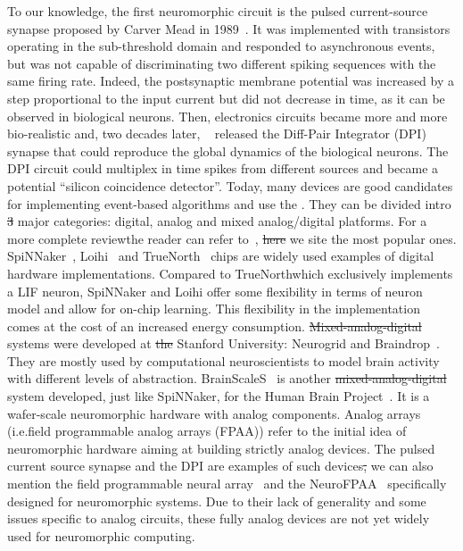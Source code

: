 \documentclass[brainsci, %
               review,accept,pdftex,moreauthors %
               ]{Definitions/mdpi}
\providecommand{\DIFadd}[1]{{\protect\color{blue}\uwave{#1}}} %
\providecommand{\DIFdel}[1]{{\protect\color{red}\sout{#1}}}                      %
\providecommand{\DIFaddbegin}{} %
\providecommand{\DIFaddend}{} %
\providecommand{\DIFdelbegin}{} %
\providecommand{\DIFdelend}{} %
\newcommand{\DIFscaledelfig}{0.5}
\newlength{\DIFdelgraphicswidth} %
\newlength{\DIFdelgraphicsheight} %
\newcommand{\DIFaddincludegraphics}[2][]{{\color{blue}\fbox{\DIFOincludegraphics[#1]{#2}}}} %
\newcommand{\DIFdelincludegraphics}[2][]{%
\sbox{\DIFdelgraphicsbox}{\DIFOincludegraphics[#1]{#2}}%
\settoboxwidth{\DIFdelgraphicswidth}{\DIFdelgraphicsbox} %
\settoboxtotalheight{\DIFdelgraphicsheight}{\DIFdelgraphicsbox} %
\scalebox{\DIFscaledelfig}{%
\parbox[b]{\DIFdelgraphicswidth}{\usebox{\DIFdelgraphicsbox}\\[-\baselineskip] \rule{\DIFdelgraphicswidth}{0em}}\llap{\resizebox{\DIFdelgraphicswidth}{\DIFdelgraphicsheight}{%
\setlength{\unitlength}{\DIFdelgraphicswidth}%
\begin{picture}(1,1)%
\thicklines\linethickness{2pt} %
{\color[rgb]{1,0,0}\put(0,0){\framebox(1,1){}}}%
{\color[rgb]{1,0,0}\put(0,0){\line( 1,1){1}}}%
{\color[rgb]{1,0,0}\put(0,1){\line(1,-1){1}}}%
\end{picture}%
}\hspace*{3pt}}} %
} %
\DeclareRobustCommand{\DIFaddbegin}{\DIFOaddbegin \let\includegraphics\DIFaddincludegraphics} %
\DeclareRobustCommand{\DIFaddend}{\DIFOaddend \let\includegraphics\DIFOincludegraphics} %
\DeclareRobustCommand{\DIFdelbegin}{\DIFOdelbegin \let\includegraphics\DIFdelincludegraphics} %
\DeclareRobustCommand{\DIFdelend}{\DIFOaddend \let\includegraphics\DIFOincludegraphics} %
\begin{document}
To our knowledge, the first neuromorphic circuit is the pulsed current-source synapse proposed by Carver Mead in 1989~\citep{mead_analog_1989}. It was implemented with transistors operating in the sub-threshold domain and responded to asynchronous events, but was not capable of discriminating two different spiking sequences with the same firing rate. Indeed, the postsynaptic membrane potential was increased by a step proportional to the input current but did not decrease in time, as it can be observed in biological neurons. Then, electronics circuits became more and more bio-realistic and, two decades later, ~\citep{bartolozzi_synaptic_2007} released the Diff-Pair Integrator (DPI) synapse that could reproduce the global dynamics of the biological neurons. The DPI circuit could multiplex in time spikes from different sources and became a potential  ``silicon coincidence detector''. Today, many devices are good candidates for implementing event-based algorithms and use the . They can be divided intro \DIFdelbegin \DIFdel{3 }\DIFdelend \DIFaddbegin \DIFadd{three }\DIFaddend major categories: digital, analog and mixed analog/digital platforms. For a more complete review\DIFaddbegin \DIFadd{, }\DIFaddend the reader can refer to~\citep{schuman_survey_2017}, \DIFdelbegin \DIFdel{here }\DIFdelend \DIFaddbegin \DIFadd{where }\DIFaddend we site the most popular ones. SpiNNaker~\citep{furber_overview_2013, furber_spinnaker_2020}, Loihi~\citep{davies_loihi_2018} and TrueNorth~\citep{merolla_million_2014} chips are widely used examples of digital hardware implementations. Compared to TrueNorth\DIFaddbegin \DIFadd{, }\DIFaddend which exclusively implements a LIF neuron, SpiNNaker and Loihi offer some flexibility in terms of neuron model and allow for on-chip learning. This flexibility in the implementation comes at the cost of an increased energy consumption. \DIFdelbegin \DIFdel{Mixed-analog-digital }\DIFdelend \DIFaddbegin \DIFadd{Mixed analog--digital }\DIFaddend systems were developed at \DIFdelbegin \DIFdel{the }\DIFdelend Stanford University: Neurogrid and Braindrop~\citep{benjamin_neurogrid_2014, neckar_braindrop_2019}. They are mostly used by computational neuroscientists to model brain activity with different levels of abstraction. BrainScaleS~\citep{schemmel_wafer-scale_2010} is another \DIFdelbegin \DIFdel{mixed-analog-digital }\DIFdelend \DIFaddbegin \DIFadd{mixed analog--digital }\DIFaddend system developed, just like SpiNNaker, for the Human Brain Project~\citep{markram_introducing_2011}. It is a wafer-scale neuromorphic hardware with analog components. Analog arrays (i.e.\DIFaddbegin \DIFadd{, }\DIFaddend field programmable analog arrays (FPAA)) refer to the initial idea of neuromorphic hardware aiming at building strictly analog devices. The pulsed current source synapse and the DPI are examples of such devices\DIFdelbegin \DIFdel{, }\DIFdelend \DIFaddbegin \DIFadd{; }\DIFaddend we can also mention the field programmable neural array~\citep{farquhar_field_2006} and the NeuroFPAA~\citep{cheng_fpaa_2009} specifically designed for neuromorphic systems. Due to their lack of generality and some issues specific to analog circuits, these fully analog devices are not yet widely used for neuromorphic computing. 
\end{document}
